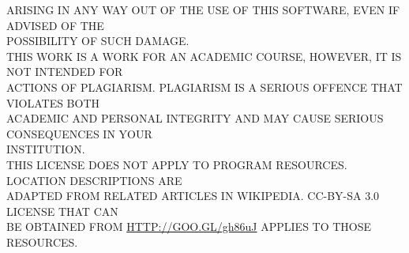 {ARISING IN ANY WAY OUT OF THE USE OF THIS SOFTWARE, EVEN IF ADVISED OF THE \\
POSSIBILITY OF SUCH DAMAGE. \\
THIS WORK IS A WORK FOR AN ACADEMIC COURSE, HOWEVER, IT IS NOT INTENDED FOR \\
ACTIONS OF PLAGIARISM. PLAGIARISM IS A SERIOUS OFFENCE THAT VIOLATES BOTH \\
ACADEMIC AND PERSONAL INTEGRITY AND MAY CAUSE SERIOUS CONSEQUENCES IN YOUR \\
INSTITUTION. \\
THIS LICENSE DOES NOT APPLY TO PROGRAM RESOURCES. LOCATION DESCRIPTIONS ARE \\
ADAPTED FROM RELATED ARTICLES IN WIKIPEDIA. CC-BY-SA 3.0 LICENSE THAT CAN \\
BE OBTAINED FROM \url{HTTP://GOO.GL/gh86uJ} APPLIES TO THOSE RESOURCES.
}